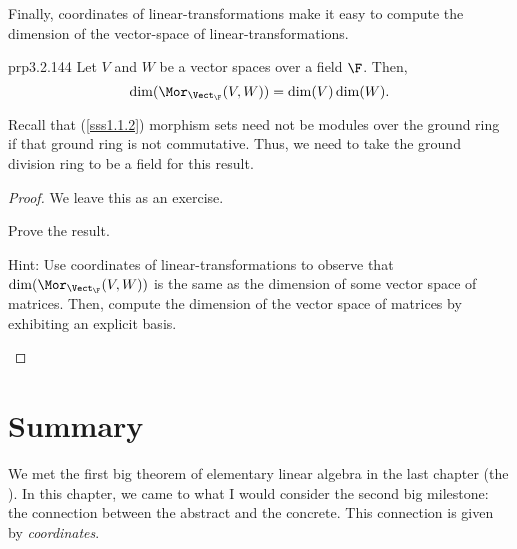 Finally, coordinates of linear-transformations make it easy to compute the dimension of the vector-space of linear-transformations.
\begin{prp}{}{prp3.2.144}
	Let $V$ and $W$ be a vector spaces over a field $\F$.  Then,
	\begin{equation}
		\dim (\Mor _{\Vect _{\F}}(V,W))=\dim (V)\dim (W).
	\end{equation}
	\begin{rmk}
		Recall that (\cref{sss1.1.2}) morphism sets need not be modules over the ground ring if that ground ring is not commutative.  Thus, we need to take the ground division ring to be a field for this result.
	\end{rmk}
	\begin{proof}
		We leave this as an exercise.
		\begin{exr}[breakable=false]{}{}
			Prove the result.
			\begin{rmk}
				Hint:  Use coordinates of linear-transformations to observe that $\dim (\Mor _{\Vect _{\F}}(V,W))$ is the same as the dimension of some vector space of matrices.  Then, compute the dimension of the vector space of matrices by exhibiting an explicit basis.
			\end{rmk}
		\end{exr}
	\end{proof}
\end{prp}

\section{Summary}

We met the first big theorem of elementary linear algebra in the last chapter (the ).  In this chapter, we came to what I would consider the second big milestone:  the connection between the abstract and the concrete.  This connection is given by \emph{coordinates}.

